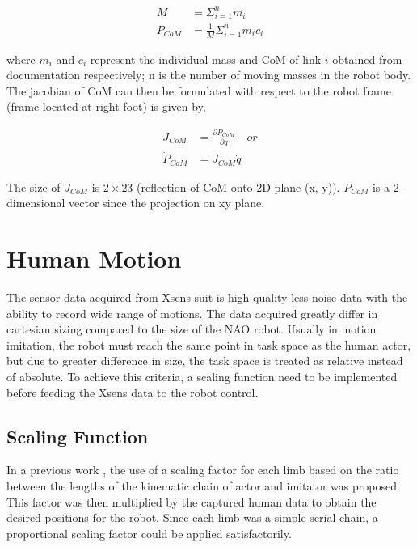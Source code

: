 \begin{align}
    \label{eq: robot-mass-com}
    M &= \Sigma_{i = 1}^n m_i \\
    P_{CoM} &= \frac{1}{M}\Sigma_{i = 1}^n m_ic_i
\end{align}

where $m_i$ and $c_i$ represent the individual mass and CoM of link $i$ obtained from documentation respectively; n is the number of moving masses 
in the robot body. The jacobian of CoM can then be formulated with respect to the robot frame (frame located at right foot) is given by,

\begin{align}
    \label{eq: robot-mass-com-2}
    J_{CoM} &= \frac{\partial P_{CoM}}{\partial q} \quad \mathit{or} \\
    \dot{P}_{CoM} &= J_{CoM} \dot{q}
\end{align}

The size of $J_{CoM}$ is $2 \times 23$ (reflection of CoM onto 2D plane (x, y)). $P_{CoM}$ is a 2-dimensional vector since the projection on xy plane.

\section{Human Motion}

The sensor data acquired from Xsens suit is high-quality less-noise data with the ability to record wide range of motions.
The data acquired greatly differ in cartesian sizing compared to the size of the NAO robot. Usually in motion imitation, the robot 
must reach the same point in task space as the human actor, but due to greater difference in size, the task space is treated as relative instead of absolute. 
To achieve this criteria, a scaling function need to be implemented before
feeding the Xsens data to the robot control.

\subsection{Scaling Function}

In a previous work \cite{scaling-human-nao}, the use of a scaling factor for each limb based on the ratio between the lengths of the kinematic chain of actor and 
imitator was proposed. This factor was then multiplied by the captured human data to obtain the desired positions for the robot. Since each limb 
was a simple serial chain, a proportional scaling factor could be applied satisfactorily.

